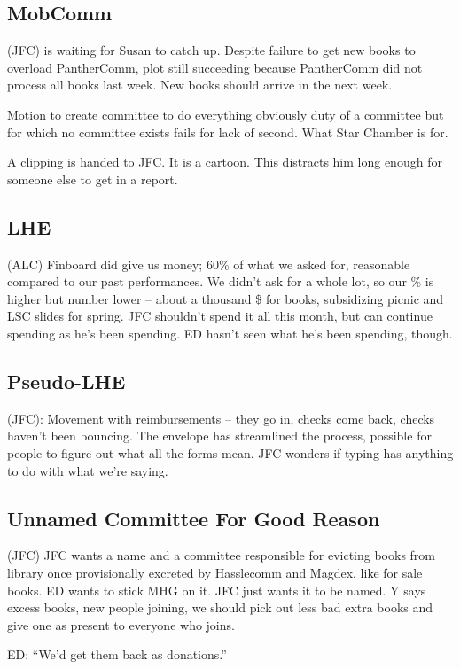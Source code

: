 \documentclass[10pt]{article}
\begin{document}
\subsection*{MobComm}(JFC)
is waiting for Susan to catch up.  Despite failure to
get new books to overload PantherComm, plot still succeeding because
PantherComm did not process all books last week.  New books should
arrive in the next week.

Motion to create committee to do everything obviously duty of a
committee but for which no committee exists fails for lack of second.
What Star Chamber is for.

A clipping is handed to JFC.  It is a cartoon. This distracts him long
enough for someone else to get in a report.

\subsection*{LHE}(ALC)
 Finboard did give us money; 60\% of what we asked for, reasonable
compared to our past performances.  We didn't ask for a whole lot, so
our \% is higher but number lower -- about a thousand \$ for books,
subsidizing picnic and LSC slides for spring.  JFC shouldn't spend it
all this month, but can continue spending as he's been spending.  ED
hasn't seen what he's been spending, though.

\subsection*{Pseudo-LHE}(JFC): 
Movement with reimbursements -- they go in, checks come back, checks
haven't been bouncing.  The envelope has streamlined the process,
possible for people to figure out what all the forms mean.  JFC
wonders if typing has anything to do with what we're saying.

\subsection*{Unnamed Committee For Good Reason}(JFC) 
JFC wants a name and a committee responsible for evicting books
from library once provisionally excreted by Hasslecomm and Magdex,
like for sale books.  ED wants to stick MHG on it.  JFC just wants it
to be named.  Y says excess books, new people joining, we should pick
out less bad extra books and give one as present to everyone who
joins.

ED: ``We'd get them back as donations.'' \\
\end{document}
